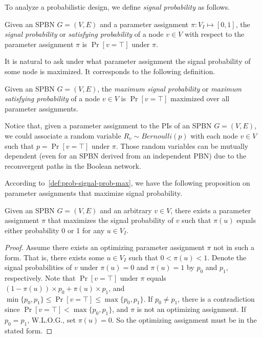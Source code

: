 To analyze a probabilistic design,
we define \textit{signal probability} as follows.
\begin{definition}
    \label{def:prob-signal-prob}
    Given an SPBN $G=(V,E)$ and a parameter assignment $\pi:V_I\mapsto[0,1]$,
    the \textit{signal probability} or \textit{satisfying probability} of a node $v \in V$
    with respect to the parameter assignment $\pi$ is $\Pr[v=\top]$ under $\pi$.
\end{definition}
It is natural to ask under what parameter assignment the signal probability of some node is maximized.
It corresponds to the following definition.
\begin{definition}
    \label{def:prob-signal-prob-max}
    Given an SPBN $G=(V,E)$,
    the \textit{maximum signal probability} or \textit{maximum satisfying probability} of a node
    $v\in V$ is $\Pr[v=\top]$ maximized over all parameter assignments.
\end{definition}

Notice that, given a parameter assignment to the PIs of an SPBN $G=(V,E)$,
we could associate a random variable $R_v\sim\textit{Bernoulli}(p)$ with each node $v \in V$
such that $p=\Pr[v=\top]$ under $\pi$.
Those random variables can be mutually dependent (even for an SPBN derived from an independent PBN)
due to the reconvergent paths in the Boolean network.

According to~\cref{def:prob-signal-prob-max},
we have the following proposition on parameter assignments that maximize signal probability.

\begin{proposition}
    Given an SPBN $G=(V,E)$ and an arbitrary $v \in V$,
    there exists a parameter assignment $\pi$ that maximizes the signal probability of $v$
    such that $\pi(u)$ equals either probability 0 or 1 for any $u \in V_I$.
\end{proposition}
\begin{proof}
    Assume there exists an optimizing parameter assignment $\pi$ not in such a form.
    That is, there exists some $u \in V_I$ such that $0<\pi(u)<1$.
    Denote the signal probabilities of $v$ under $\pi(u)=0$ and $\pi(u)=1$ by $p_0$ and $p_1$, respectively.
    Note that $\Pr[v=\top]$ under $\pi$ equals $(1-\pi(u)) \times p_0 + \pi(u) \times p_1$,
    and $\min\{p_0,p_1\}\leq\Pr[v=\top]\leq\max\{p_0,p_1\}$.
    If $p_0 \neq p_1$,
    there is a contradiction since $\Pr[v=\top]<\max\{p_0,p_1\}$,
    and $\pi$ is not an optimizing assignment.
    If $p_0=p_1$, W.L.O.G., set $\pi(u)=0$.
    So the optimizing assignment must be in the stated form.
\end{proof}

